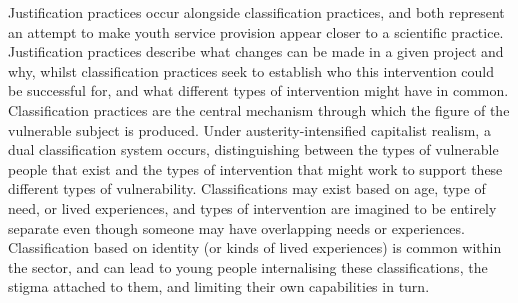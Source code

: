 Justification practices occur alongside classification practices, and both represent an attempt to make youth service provision appear closer to a scientific practice. Justification practices describe what changes can be made in a given project and why, whilst classification practices seek to establish who this intervention could be successful for, and what different types of intervention might have in common. Classification practices are the central mechanism through which the figure of the vulnerable subject is produced. Under austerity-intensified capitalist realism, a dual classification system occurs, distinguishing between the types of vulnerable people that exist and the types of intervention that might work to support these different types of vulnerability. Classifications may exist based on age, type of need, or lived experiences, and types of intervention are imagined to be entirely separate even though someone may have overlapping needs or experiences. Classification based on identity (or kinds of lived experiences) is common within the sector, and can lead to young people internalising these classifications, the stigma attached to them, and limiting their own capabilities in turn. 

